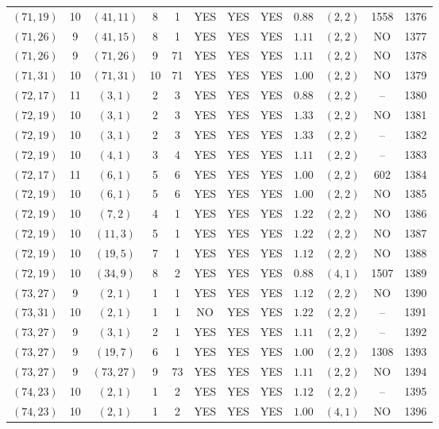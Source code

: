 \begin{longtable}{|c|c|c|c|c|c|c|c|c|c|c|c|}
$(71,19)$ & 10 & $(41,11)$ & 8 & 1 & YES & YES & YES & $0.88$ & $(2,2)$ & 1558 & 1376\\
$(71,26)$ & 9 & $(41,15)$ & 8 & 1 & YES & YES & YES & $1.11$ & $(2,2)$ & NO & 1377\\
$(71,26)$ & 9 & $(71,26)$ & 9 & 71 & YES & YES & YES & $1.11$ & $(2,2)$ & NO & 1378\\
$(71,31)$ & 10 & $(71,31)$ & 10 & 71 & YES & YES & YES & $1.00$ & $(2,2)$ & NO & 1379\\
$(72,17)$ & 11 & $(3,1)$ & 2 & 3 & YES & YES & YES & $0.88$ & $(2,2)$ & -- & 1380\\
$(72,19)$ & 10 & $(3,1)$ & 2 & 3 & YES & YES & YES & $1.33$ & $(2,2)$ & NO & 1381\\
$(72,19)$ & 10 & $(3,1)$ & 2 & 3 & YES & YES & YES & $1.33$ & $(2,2)$ & -- & 1382\\
$(72,19)$ & 10 & $(4,1)$ & 3 & 4 & YES & YES & YES & $1.11$ & $(2,2)$ & -- & 1383\\
$(72,17)$ & 11 & $(6,1)$ & 5 & 6 & YES & YES & YES & $1.00$ & $(2,2)$ & 602 & 1384\\
$(72,19)$ & 10 & $(6,1)$ & 5 & 6 & YES & YES & YES & $1.00$ & $(2,2)$ & NO & 1385\\
$(72,19)$ & 10 & $(7,2)$ & 4 & 1 & YES & YES & YES & $1.22$ & $(2,2)$ & NO & 1386\\
$(72,19)$ & 10 & $(11,3)$ & 5 & 1 & YES & YES & YES & $1.22$ & $(2,2)$ & NO & 1387\\
$(72,19)$ & 10 & $(19,5)$ & 7 & 1 & YES & YES & YES & $1.12$ & $(2,2)$ & NO & 1388\\
$(72,19)$ & 10 & $(34,9)$ & 8 & 2 & YES & YES & YES & $0.88$ & $(4,1)$ & 1507 & 1389\\
$(73,27)$ & 9 & $(2,1)$ & 1 & 1 & YES & YES & YES & $1.12$ & $(2,2)$ & NO & 1390\\
$(73,31)$ & 10 & $(2,1)$ & 1 & 1 & NO & YES & YES & $1.22$ & $(2,2)$ & -- & 1391\\
$(73,27)$ & 9 & $(3,1)$ & 2 & 1 & YES & YES & YES & $1.11$ & $(2,2)$ & -- & 1392\\
$(73,27)$ & 9 & $(19,7)$ & 6 & 1 & YES & YES & YES & $1.00$ & $(2,2)$ & 1308 & 1393\\
$(73,27)$ & 9 & $(73,27)$ & 9 & 73 & YES & YES & YES & $1.11$ & $(2,2)$ & NO & 1394\\
$(74,23)$ & 10 & $(2,1)$ & 1 & 2 & YES & YES & YES & $1.12$ & $(2,2)$ & -- & 1395\\
$(74,23)$ & 10 & $(2,1)$ & 1 & 2 & YES & YES & YES & $1.00$ & $(4,1)$ & NO & 1396\\

\end{longtable}
